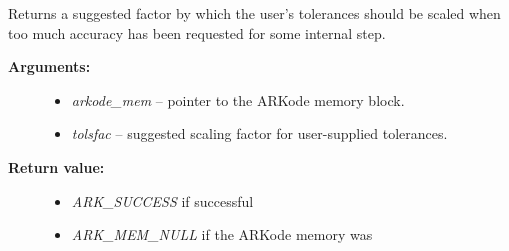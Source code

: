 \documentclass[letterpaper,10pt,english]{sphinxmanual}
\begin{document}

\begin{fulllineitems}
\label{c_interface/User_callable:c.ARKodeGetTolScaleFactor}
Returns a suggested factor by which the user's
tolerances should be scaled when too much accuracy has been
requested for some internal step.
\begin{description}
\item[{\textbf{Arguments:}}] \leavevmode\begin{itemize}
\item {} 
\emph{arkode\_mem} -- pointer to the ARKode memory block.

\item {} 
\emph{tolsfac} -- suggested scaling factor for user-supplied tolerances.

\end{itemize}

\item[{\textbf{Return value:}}] \leavevmode\begin{itemize}
\item {} 
\emph{ARK\_SUCCESS} if successful

\item {} 
\emph{ARK\_MEM\_NULL} if the ARKode memory was 

\end{itemize}

\end{description}

\end{fulllineitems}

\end{document}
